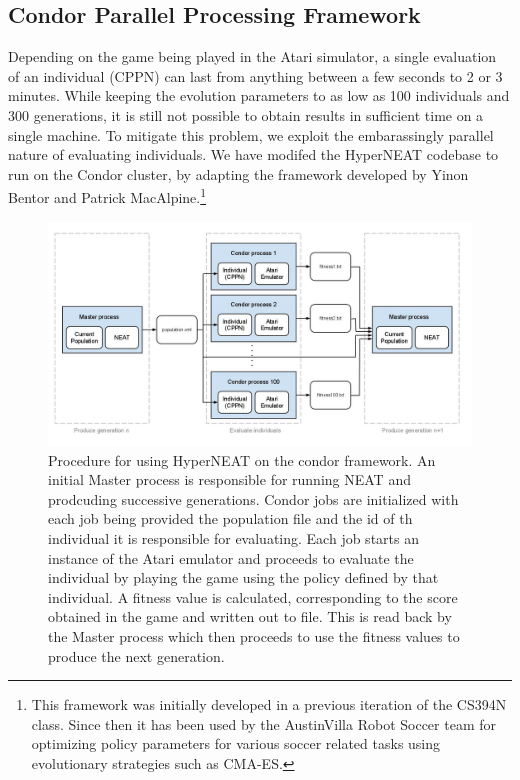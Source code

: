 \documentclass{acm_proc_article-sp}
\begin{document}
\subsection{Condor Parallel Processing Framework}
\label{sec:condor}
Depending on the game being played in the Atari simulator, a single evaluation of an individual (CPPN) can last from anything between a few seconds to 2 or 3 minutes. While keeping the evolution parameters to as low as 100 individuals and 300 generations, it is still not possible to obtain results in sufficient time on a single machine. To mitigate this problem, we exploit the embarassingly parallel nature of evaluating individuals. We have modifed the HyperNEAT codebase to run on the Condor cluster, by adapting the framework developed by Yinon Bentor and Patrick MacAlpine.\footnote{This framework was initially developed in a previous iteration of the CS394N class. Since then it has been used by the AustinVilla Robot Soccer team for optimizing policy parameters for various soccer related tasks using evolutionary strategies such as CMA-ES.}

\begin{figure}[ht]
\begin{center}
\includegraphics[width=\textwidth]{figures/CondorHyperNEAT}
\end{center}
\caption{Procedure for using HyperNEAT on the condor framework. An initial Master process is responsible for running NEAT and prodcuding successive generations. Condor jobs are initialized with each job being provided the population file and the id of th individual it is responsible for evaluating. Each job starts an instance of the Atari emulator and proceeds to evaluate the individual by playing the game using the policy defined by that individual. A fitness value is calculated, corresponding to the score obtained in the game and written out to file. This is read back by the Master process which then proceeds to use the fitness values to produce the next generation.}
\label{fig:condor}
\end{figure}
\end{document}
